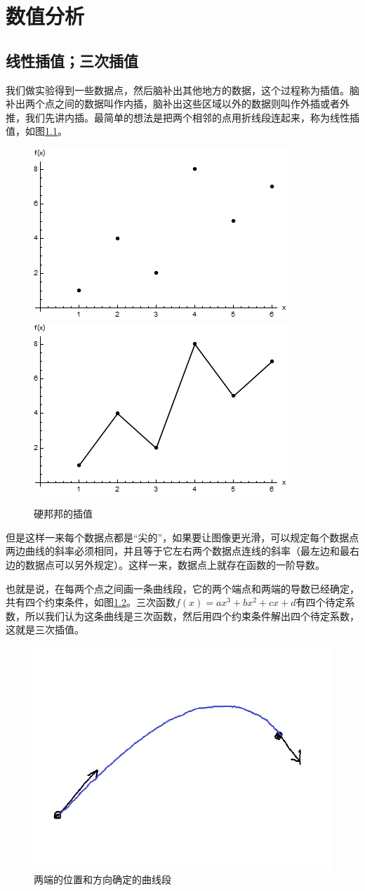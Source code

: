\chapter{数值分析}
\section{线性插值；三次插值}
我们做实验得到一些数据点，然后脑补出其他地方的数据，这个过程称为插值。脑补出两个点之间的数据叫作内插，脑补出这些区域以外的数据则叫作外插或者外推，我们先讲内插。最简单的想法是把两个相邻的点用折线段连起来，称为线性插值，如图\ref{fig-disc-data}。
\begin{figure}[htb]
\centering
\includegraphics[width=0.33\linewidth]{fig/disc-data.png}
\includegraphics[width=0.33\linewidth]{fig/disc-data-line.png}
\caption{硬邦邦的插值}
\label{fig-disc-data}
\end{figure}

但是这样一来每个数据点都是“尖的”，如果要让图像更光滑，可以规定每个数据点两边曲线的斜率必须相同，并且等于它左右两个数据点连线的斜率（最左边和最右边的数据点可以另外规定）。这样一来，数据点上就存在函数的一阶导数。

也就是说，在每两个点之间画一条曲线段，它的两个端点和两端的导数已经确定，共有四个约束条件，如图\ref{fig-cubic-interpo}。三次函数$f(x)=a x^3+b x^2+c x+d$有四个待定系数，所以我们认为这条曲线是三次函数，然后用四个约束条件解出四个待定系数，这就是三次插值。
\begin{figure}[htb]
\centering
\includegraphics[width=0.33\linewidth]{fig/cubic-interpo.png}
\caption{两端的位置和方向确定的曲线段}
\label{fig-cubic-interpo}
\end{figure}

